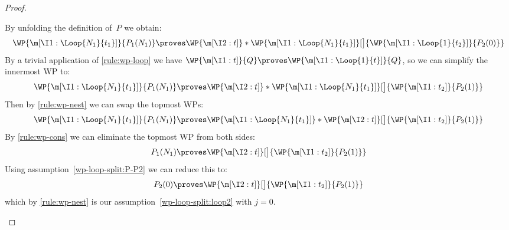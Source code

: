 \documentclass[acmsmall,nonacm,screen,appendix]{acmart}
\begin{document}
\begin{proof}
\begin{casesplit}
  \case[$k=N_1$] By unfolding the definition of~$P$ we obtain:
    \[
      \WP {\m[\I1: \Loop{N_1}{t_1}]} { P_1(N_1) }
      \proves
      \WP {\m[\I2: t]}*{
        \WP {\m[\I1: \Loop{N_1}{t_1}]}[\big]{
          \WP {\m[\I1: \Loop{1}{t_2}]} { P_2(0) }
        }
      }
    \]
    By a trivial application of \ref{rule:wp-loop}
    we have $
      \WP {\m[\I1: t]} { Q }
      \proves
      \WP {\m[\I1: \Loop{1}{t}]} { Q }
    $, so we can simplify the innermost WP to:
    \[
      \WP {\m[\I1: \Loop{N_1}{t_1}]} { P_1(N_1) }
      \proves
      \WP {\m[\I2: t]}*{
        \WP {\m[\I1: \Loop{N_1}{t_1}]}[\big]{
          \WP {\m[\I1: t_2]} { P_2(1) }
        }
      }
    \]
    Then by \ref{rule:wp-nest} we can swap the topmost WPs:
    \[
      \WP {\m[\I1: \Loop{N_1}{t_1}]} { P_1(N_1) }
      \proves
      \WP {\m[\I1: \Loop{N_1}{t_1}]}*{
        \WP {\m[\I2: t]}[\big]{
          \WP {\m[\I1: t_2]} { P_2(1) }
        }
      }
    \]
    By \ref{rule:wp-cons} we can eliminate the topmost WP from both sides:
    \[
      P_1(N_1)
      \proves
      \WP {\m[\I2: t]}[\big]{
        \WP {\m[\I1: t_2]} { P_2(1) }
      }
    \]
    Using assumption~\eqref{wp-loop-split:P-P2} we can reduce this to:
    \[
      P_2(0)
      \proves
      \WP {\m[\I2: t]}[\big]{
        \WP {\m[\I1: t_2]} { P_2(1) }
      }
    \]
    which by \ref{rule:wp-nest} is our assumption~\eqref{wp-loop-split:loop2}
    with $j=0$.


\end{casesplit}
\end{proof}
\end{document}
